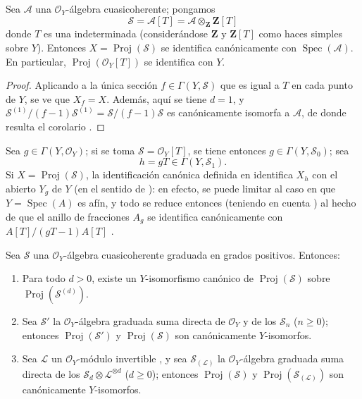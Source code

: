 \documentclass[oneside,10pt]{amsart}
\renewcommand{\geq}{\geqslant}
\newcommand{\oldpage}[2][]{\marginnote{\normalfont\footnotesize\textbf{#1}~|~#2}\ignorespaces}
\let\EGAOriginalLabel\label
\renewcommand{\label}[1]{\phantomsection\EGAOriginalLabel{#1}}
\begin{document}
\begin{corollary}[3.1.7]
\label{II.3.1.7-fr}
Sea $\mathcal{A}$ una $\mathcal{O}_Y$-álgebra cuasicoherente; pongamos
\[
  \mathcal{S}=\mathcal{A}[T]
  =\mathcal{A}\otimes_{\mathbf{Z}}\mathbf{Z}[T]
\]
donde $T$ es una indeterminada (considerándose $\mathbf{Z}$ y $\mathbf{Z}[T]$ como haces simples sobre $Y$).
Entonces $X=\operatorname{Proj}(\mathcal{S})$ se identifica canónicamente con $\operatorname{Spec}(\mathcal{A})$.
En particular, $\operatorname{Proj}(\mathcal{O}_Y[T])$ se identifica con $Y$.
\end{corollary}

\begin{proof}
Aplicando  a la única sección $f\in\Gamma(Y,\mathcal{S})$ que es igual a $T$ en cada punto de $Y$, se ve que $X_f=X$.
Además, aquí se tiene $d=1$, y $\mathcal{S}^{(1)}/(f-1)\mathcal{S}^{(1)}
=\mathcal{S}/(f-1)\mathcal{S}$ es canónicamente isomorfa a $\mathcal{A}$, de donde resulta el corolario .
\end{proof}

Sea $g\in\Gamma(Y,\mathcal{O}_Y)$; si se toma $\mathcal{S}=\mathcal{O}_Y[T]$, se tiene entonces $g\in\Gamma(Y,\mathcal{S}_0)$; sea
\[
  h=gT\in\Gamma(Y,\mathcal{S}_1).
\]
Si $X=\operatorname{Proj}(\mathcal{S})$, la identificación canónica definida en  identifica $X_h$ con el abierto $Y_g$ de $Y$ (en el sentido de ): en efecto, se puede limitar al caso en que $Y=\operatorname{Spec}(A)$ es afín, y todo se reduce entonces (teniendo en cuenta ) al hecho de que el anillo de fracciones $A_g$ se identifica canónicamente con $A[T]/(gT-1)A[T]$ .

\begin{proposition}[3.1.8]
\label{II.3.1.8-fr}
Sea $\mathcal{S}$ una $\mathcal{O}_Y$-álgebra cuasicoherente graduada en grados positivos.
Entonces:
\begin{enumerate}
  \item[(i)] Para todo $d>0$, existe un $Y$-isomorfismo canónico de $\operatorname{Proj}(\mathcal{S})$ sobre $\operatorname{Proj}(\mathcal{S}^{(d)})$.
\oldpage[II]{52}
  \item[(ii)] Sea $\mathcal{S}'$ la $\mathcal{O}_Y$-álgebra graduada suma directa de $\mathcal{O}_Y$ y de los $\mathcal{S}_n$ ($n\geq0$); entonces $\operatorname{Proj}(\mathcal{S}')$ y $\operatorname{Proj}(\mathcal{S})$ son canónicamente $Y$-isomorfos.
  \item[(iii)] Sea $\mathcal{L}$ un $\mathcal{O}_Y$-módulo invertible , y sea $\mathcal{S}_{(\mathcal{L})}$ la $\mathcal{O}_Y$-álgebra graduada suma directa de los $\mathcal{S}_d\otimes\mathcal{L}^{\otimes d}$ ($d\geq0$); entonces $\operatorname{Proj}(\mathcal{S})$ y $\operatorname{Proj}(\mathcal{S}_{(\mathcal{L})})$ son canónicamente $Y$-isomorfos.
\end{enumerate}
\end{proposition}
\end{document}
